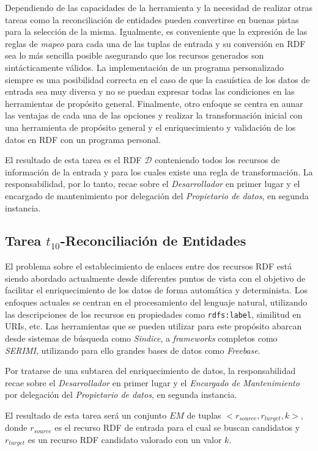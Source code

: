 Dependiendo de las capacidades de la herramienta y la necesidad de realizar otras tareas como 
la reconciliación de entidades pueden convertirse en buenas pistas para la selección de la misma. Igualmente, 
es conveniente que la expresión de las reglas de \textit{mapeo} para cada una de las tuplas de 
entrada y su conversión en RDF sea lo más sencilla posible asegurando que los recursos 
generados son sintácticamente válidos. La implementación de un programa personalizado siempre 
es una posibilidad correcta en el caso de que la casuística de los datos de entrada sea 
muy diversa y no se puedan expresar todas las condiciones en las herramientas de propósito general. Finalmente, 
otro enfoque se centra en aunar las ventajas de cada una de las opciones y realizar la transformación 
inicial con una herramienta de propósito general y el enriquecimiento y validación de los datos en RDF
con un programa personal. 

El resultado de esta tarea es el \dataset RDF $\mathcal{D}$ conteniendo todos los recursos de información 
de la entrada y para los cuales existe una regla de transformación. La responsabilidad, por lo tanto, 
recae sobre el \textit{Desarrollador} en primer lugar y el encargado de mantenimiento por delegación del \textit{Propietario de datos}, 
en segunda instancia. 

\subsection{Tarea $t_{10}$-Reconciliación de Entidades}
El problema sobre el establecimiento de enlaces entre dos recursos \gls{RDF} está siendo
abordado actualmente desde diferentes puntos de vista con el objetivo de facilitar
el enriquecimiento de los datos de forma automática y determinista. Los enfoques
actuales se centran en el procesamiento del lenguaje natural, utilizando
las descripciones de los recursos en propiedades como \texttt{rdfs:label}, similitud
en \gls{URI}s, etc. Las herramientas que se pueden utilizar para este propósito abarcan desde
sistemas de búsqueda como \textit{Sindice}, a \textit{frameworks} completos como \textit{SERIMI}, utilizando
para ello grandes bases de datos como \textit{Freebase}.

Por tratarse de una subtarea del enriquecimiento de datos, la responsabilidad recae sobre el \textit{Desarrollador} 
en primer lugar y el \textit{Encargado de Mantenimiento} por delegación del \textit{Propietario de datos}, en segunda instancia. 

El resultado de esta tarea será un conjunto $EM$ de tuplas $<r_{source}, r_{target}, k>$, donde $r_{source}$ es el 
recurso RDF de entrada para el cual se buscan candidatos y $r_{target}$ es un recurso RDF candidato valorado con un valor $k$.


